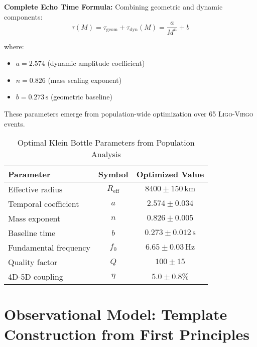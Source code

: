 \documentclass[reprint,amsmath,amssymb,aps,prd]{revtex4-2}
\newcommand{\Reff}{R_{\text{eff}}}
\newcommand{\LIGO}{\textsc{Ligo}\xspace}
\newcommand{\Virgo}{\textsc{Virgo}\xspace}
\begin{document}
\textbf{Complete Echo Time Formula:}
Combining geometric and dynamic components:
\begin{equation}
\tau(M) = \tau_{\text{geom}} + \tau_{\text{dyn}}(M) = \frac{a}{M^n} + b
\label{eq:complete_echo_time}
\end{equation}

where:
\begin{itemize}
\item $a = 2.574$ (dynamic amplitude coefficient)
\item $n = 0.826$ (mass scaling exponent)
\item $b = 0.273\,\text{s}$ (geometric baseline)
\end{itemize}

These parameters emerge from population-wide optimization over 65 \LIGO-\Virgo events.

\begin{table}[htbp]
\caption{Optimal Klein Bottle Parameters from Population Analysis}
\begin{ruledtabular}
\begin{tabular}{lcc}
Parameter & Symbol & Optimized Value \\
\hline
Effective radius & $\Reff$ & $8400 \pm 150\,\text{km}$ \\
Temporal coefficient & $a$ & $2.574 \pm 0.034$ \\
Mass exponent & $n$ & $0.826 \pm 0.005$ \\
Baseline time & $b$ & $0.273 \pm 0.012\,\text{s}$ \\
Fundamental frequency & $f_0$ & $6.65 \pm 0.03\,\text{Hz}$ \\
Quality factor & $Q$ & $100 \pm 15$ \\
4D-5D coupling & $\eta$ & $5.0 \pm 0.8\%$ \\
\end{tabular}
\end{ruledtabular}
\label{tab:klein_parameters}
\end{table}


\section{Observational Model: Template Construction from First Principles}
\label{sec:observational}
\end{document}
